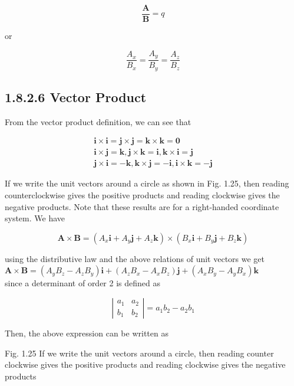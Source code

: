 \documentclass[10pt]{article}
\begin{document}
$$
\frac{\mathbf{A}}{\mathbf{B}}=q
$$

or

$$
\frac{A_{x}}{B_{x}}=\frac{A_{y}}{B_{y}}=\frac{A_{z}}{B_{z}}
$$

\subsection*{1.8.2.6 Vector Product}
From the vector product definition, we can see that

$$
\begin{gathered}
\mathbf{i} \times \mathbf{i}=\mathbf{j} \times \mathbf{j}=\mathbf{k} \times \mathbf{k}=\mathbf{0} \\
\mathbf{i} \times \mathbf{j}=\mathbf{k}, \mathbf{j} \times \mathbf{k}=\mathbf{i}, \mathbf{k} \times \mathbf{i}=\mathbf{j} \\
\mathbf{j} \times \mathbf{i}=-\mathbf{k}, \mathbf{k} \times \mathbf{j}=-\mathbf{i}, \mathbf{i} \times \mathbf{k}=-\mathbf{j}
\end{gathered}
$$

If we write the unit vectors around a circle as shown in Fig. 1.25, then reading counterclockwise gives the positive products and reading clockwise gives the negative products. Note that these results are for a right-handed coordinate system. We have

$$
\mathbf{A} \times \mathbf{B}=\left(A_{x} \mathbf{i}+A_{y} \mathbf{j}+A_{z} \mathbf{k}\right) \times\left(B_{x} \mathbf{i}+B_{y} \mathbf{j}+B_{z} \mathbf{k}\right)
$$

using the distributive law and the above relations of unit vectors we get\\
$\mathbf{A} \times \mathbf{B}=\left(A_{y} B_{z}-A_{z} B_{y}\right) \mathbf{i}+\left(A_{z} B_{x}-A_{x} B_{z}\right) \mathbf{j}+\left(A_{x} B_{y}-A_{y} B_{x}\right) \mathbf{k}$\\
since a determinant of order 2 is defined as

$$
\left|\begin{array}{ll}
a_{1} & a_{2} \\
b_{1} & b_{2}
\end{array}\right|=a_{1} b_{2}-a_{2} b_{1}
$$

Then, the above expression can be written as

Fig. 1.25 If we write the unit vectors around a circle, then reading counter clockwise gives the positive products and reading clockwise gives the negative products
\end{document}
